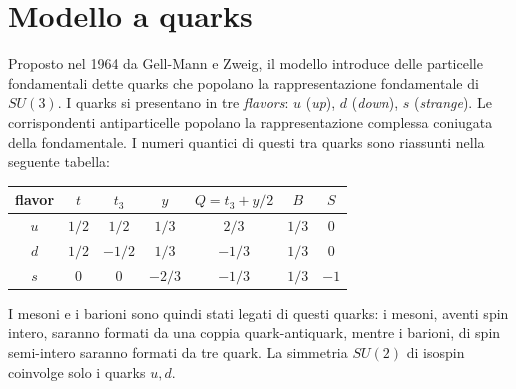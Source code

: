\documentclass[12pt,a4paper]{article}
\theoremstyle{definition}
\numberwithin{equation}{section}
\begin{document}
\section{Modello a quarks}
Proposto nel 1964 da Gell-Mann e Zweig, il modello introduce delle particelle fondamentali dette quarks che popolano la rappresentazione fondamentale di $SU(3)$. I quarks si presentano in tre \emph{flavors}: $u$ (\emph{up}), $d$ (\emph{down}), $s$ (\emph{strange}). Le corrispondenti antiparticelle popolano la rappresentazione complessa coniugata della fondamentale. I numeri quantici di questi tra quarks sono riassunti nella seguente tabella:
\begin{table}[h]
\centering
\begin{tabular}{c|c|c|c|c|c|c}
\toprule
flavor & $t$ & $t_3$ & $y$ & $Q=t_3+y/2$ & $B$ & $S$ \\
\midrule
$u$ & $1/2$ & $1/2$ & $1/3$ & $2/3$ & $1/3$ & 0 \\
$d$ & $1/2$ & $-1/2$ & $1/3$ & $-1/3$ & $1/3$ & 0 \\
$s$ & $0$ & $0$ & $-2/3$ & $-1/3$ & $1/3$ & $-1$\\
\midrule
\end{tabular}
\end{table}

I mesoni e i barioni sono quindi stati legati di questi quarks: i mesoni, aventi spin intero, saranno formati da una coppia quark-antiquark, mentre i barioni, di spin semi-intero saranno formati da tre quark. La simmetria $SU(2)$ di isospin coinvolge solo i quarks $u,d$. \\
\end{document}
